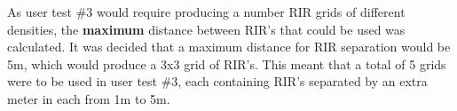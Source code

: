 \documentclass[../../main.tex]{subfiles}
\begin{document}
		As user test \#3 would require producing a number \ac{RIR} grids of different densities, the \textbf{maximum} distance between \ac{RIR}'s that could be used was calculated. It was decided that a maximum distance for \ac{RIR} separation would be 5m, which would produce a 3x3 grid of \ac{RIR}'s. This meant that a total of 5 grids were to be used in user test \#3, each containing \ac{RIR}'s separated by an extra meter in each from 1m to 5m.
\end{document}
